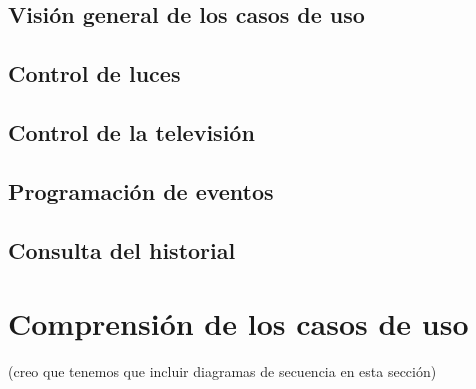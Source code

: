 \subsection{Visi\'on general de los casos de uso}
\subsection{Control de luces}
\subsection{Control de la televisi\'on}
\subsection{Programaci\'on de eventos}
\subsection{Consulta del historial}
\section{Comprensi\'on de los casos de uso}
(creo que tenemos que incluir diagramas de secuencia en esta secci\'on)
